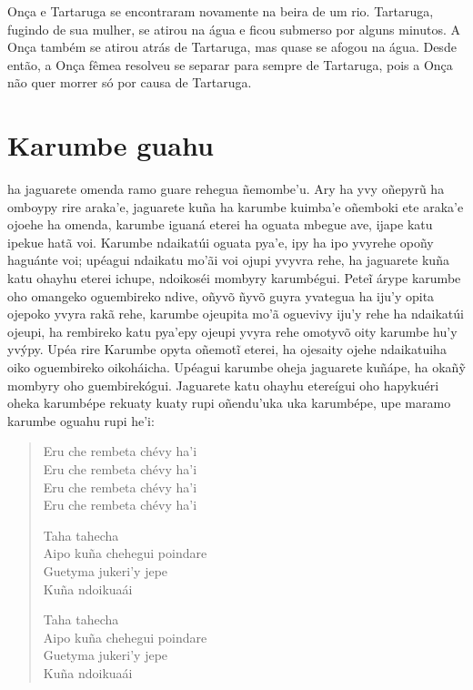 
Onça e Tartaruga se encontraram novamente na beira de um rio. Tartaruga, fugindo de sua mulher, se atirou na água e ficou submerso por alguns minutos. A Onça também se atirou atrás de Tartaruga, mas quase se afogou na água.
Desde então, a Onça fêmea resolveu se separar para sempre de Tartaruga,
pois a Onça não quer morrer só por causa de Tartaruga.

\chapter{Karumbe guahu}

 ha jaguarete omenda ramo guare rehegua ñemombe'u. Ary ha yvy
oñepyrũ ha omboypy rire araka'e, jaguarete kuña ha karumbe kuimba'e
oñemboki ete araka'e ojoehe ha omenda, karumbe iguaná eterei ha oguata
mbegue ave, ijape katu ipekue hatã voi. Karumbe ndaikatúi oguata pya'e,
ipy ha ipo yvyrehe opoñy haguánte voi; upéagui ndaikatu mo'ãi voi ojupi
yvyvra rehe, ha jaguarete kuña katu ohayhu eterei ichupe, ndoikoséi
mombyry karumbégui. Peteĩ árype karumbe oho omangeko oguembireko ndive,
oñyvõ ñyvõ guyra yvategua ha iju'y opita ojepoko yvyra rakã rehe,
karumbe ojeupita mo'ã oguevivy iju'y rehe ha ndaikatúi ojeupi, ha
rembireko katu pya'epy ojeupi yvyra rehe omotyvõ oity karumbe hu'y
yvýpy. Upéa rire Karumbe opyta oñemotĩ eterei, ha ojesaity ojehe
ndaikatuiha oiko oguembireko oikoháicha. Upéagui karumbe oheja jaguarete
kuñápe, ha okañỹ mombyry oho guembirekógui. Jaguarete katu ohayhu
etereígui oho hapykuéri oheka karumbépe rekuaty kuaty rupi oñendu'uka
uka karumbépe, upe maramo karumbe oguahu rupi he'i:

\begin{verse}
Eru che rembeta chévy ha'i\\
Eru che rembeta chévy ha'i\\
Eru che rembeta chévy ha'i\\
Eru che rembeta chévy ha'i

\pagebreak       
Taha tahecha\\
Aipo kuña chehegui poindare\\
Guetyma jukeri'y jepe\\
Kuña ndoikuaái
       
Taha tahecha\\
Aipo kuña chehegui poindare\\
Guetyma jukeri'y jepe\\
Kuña ndoikuaái
\end{verse}


